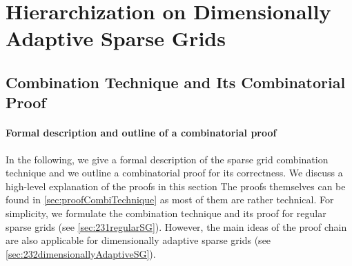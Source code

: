 \section{Hierarchization on Dimensionally Adaptive Sparse Grids}
\label{sec:43dimAdaptive}

\blindtext{}



\subsection{Combination Technique and Its Combinatorial Proof}
\label{sec:431combiTechniqueProof}



\blindtext{}

\paragraph{Formal description and outline of a combinatorial proof}

In the following, we give a formal description of the
sparse grid combination technique and we outline a combinatorial proof
for its correctness.
We discuss a high-level explanation of the proofs in this section
The proofs themselves can be found in \cref{sec:proofCombiTechnique}
as most of them are rather technical.
For simplicity,
we formulate the combination technique and its proof for regular
sparse grids (see \cref{sec:231regularSG}).
However, the main ideas of the proof chain are also applicable
for dimensionally adaptive sparse grids
(see \cref{sec:232dimensionallyAdaptiveSG}).

